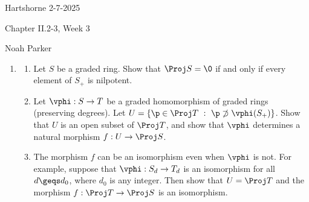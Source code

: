 \documentclass[12pt]{amsart}
\begin{document}
{Hartshorne} \hfill {2-7-2025}

\bigskip\bigskip

\begin{center}

{\sc Chapter II.2-3, Week 3}

\end{center}

\begin{center}

  {Noah Parker} %
    
\end{center}

\bigskip

\begin{enumerate}
	\item[2.14.] {
      \begin{enumerate}
        \item Let $S$ be a graded ring.
          Show that $\Proj S=\0$ if and only if every element of $S_+$ is nilpotent.
        \item Let $\vphi:S\to T$ be a graded homomorphism of graded rings (preserving degrees).
          Let $U=\{\p\in \Proj T~:~\p\not\supset\vphi(S_+)\}$.
          Show that $U$ is an open subset of $\Proj T$, and show that $\vphi$ determines a natural morphism $f:U\to \Proj S$.
        \item The morphism $f$ can be an isomorphism even when $\vphi$ is not.
          For example, suppose that $\vphi:S_d\to T_d$ is an isomorphism for all $d\geqs d_0$, where $d_0$ is any integer.
          Then show that $U=\Proj T$ and the morphism $f:\Proj T\to \Proj S$ is an isomorphism.
      \end{enumerate}
    }
\end{enumerate}
\end{document}
